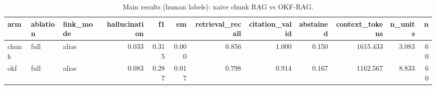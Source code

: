 \begin{table}[t]
\caption{Main results (human labels): naive chunk RAG vs OKF-RAG.}
\label{tab:main-human}
\begin{tabular}{lllrrrrrrrrr}
\toprule
arm & ablation & link\_mode & hallucination & f1 & em & retrieval\_recall & citation\_valid & abstained & context\_tokens & n\_units & n \\
\midrule
chunk & full & alias & 0.033 & 0.315 & 0.000 & 0.856 & 1.000 & 0.150 & 1615.433 & 3.083 & 60 \\
okf & full & alias & 0.083 & 0.287 & 0.017 & 0.798 & 0.914 & 0.167 & 1162.567 & 8.833 & 60 \\
\bottomrule
\end{tabular}
\end{table}
